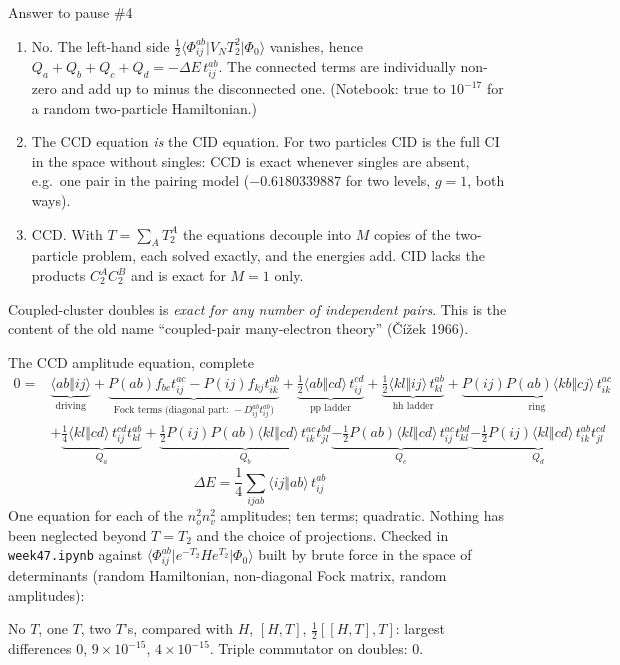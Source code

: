 \documentclass[aspectratio=169,10pt]{beamer}
\newcounter{thinkctr}
\newcommand{\thinka}[1]{%
  \vfill
  \begin{tcolorbox}[enhanced,colback=paleteal,colframe=teal,boxrule=1.2pt,arc=4pt,
    grow to left by=6mm,grow to right by=6mm,
    left=16pt,right=16pt,top=16pt,bottom=18pt,
    fonttitle=\bfseries\Large,fontupper=\large,
    title={Answer to pause \#\thethinkctr}]
  #1
  \end{tcolorbox}
  \vfill}
\newcommand{\numbox}[1]{%
  \begin{tcolorbox}[colback=palegreen,colframe=teal!70!black,title={\bfseries Measured}]
  #1
  \end{tcolorbox}}
\newcommand{\mel}[3]{\langle #1\lvert #2\rvert #3\rangle}
\newcommand{\ph}{\Phi_0}
\newcommand{\as}[4]{\langle #1#2\Vert #3#4\rangle}
\begin{document}
\begin{frame}[shrink=1]{Answer to pause \#4}
\thinka{%
\begin{enumerate}
\item No. The left-hand side $\tfrac12\mel{\Phi_{ij}^{ab}}{V_NT_2^2}{\ph}$ vanishes, hence $Q_a+Q_b+Q_c+Q_d=-\Delta E\,t_{ij}^{ab}$. The connected terms are individually non-zero and add up to minus the disconnected one. (Notebook: true to $10^{-17}$ for a random two-particle Hamiltonian.)
\item The CCD equation \emph{is} the CID equation. For two particles CID is the full CI in the space without singles: CCD is exact whenever singles are absent, e.g.\ one pair in the pairing model ($-0.6180339887$ for two levels, $g=1$, both ways).
\item CCD. With $T=\sum_AT_2^{A}$ the equations decouple into $M$ copies of the two-particle problem, each solved exactly, and the energies add. CID lacks the products $C_2^AC_2^B$ and is exact for $M=1$ only.
\end{enumerate}
Coupled-cluster doubles is \emph{exact for any number of independent pairs}. This is the content of the old name ``coupled-pair many-electron theory'' (\v{C}\'i\v{z}ek 1966).}
\end{frame}

\begin{frame}[shrink=10]{The CCD amplitude equation, complete}
\small
\begin{align*}
0={}&\underbrace{\as abij}_{\text{driving}}
 +\underbrace{P(ab)f_{bc}t_{ij}^{ac}-P(ij)f_{kj}t_{ik}^{ab}}_{\text{Fock terms (diagonal part: }-D_{ij}^{ab}t_{ij}^{ab})}
 +\underbrace{\tfrac12\as abcd\,t_{ij}^{cd}}_{\text{pp ladder}}
 +\underbrace{\tfrac12\as klij\,t_{kl}^{ab}}_{\text{hh ladder}}
 +\underbrace{P(ij)P(ab)\as kbcj\,t_{ik}^{ac}}_{\text{ring}}\\[2pt]
 &+\underbrace{\tfrac14\as klcd\,t_{ij}^{cd}t_{kl}^{ab}}_{Q_a}
 +\underbrace{\tfrac12P(ij)P(ab)\as klcd\,t_{ik}^{ac}t_{jl}^{bd}}_{Q_b}
 \underbrace{-\tfrac12P(ab)\as klcd\,t_{ij}^{ac}t_{kl}^{bd}}_{Q_c}
 \underbrace{-\tfrac12P(ij)\as klcd\,t_{ik}^{ab}t_{jl}^{cd}}_{Q_d}
\end{align*}
\[
 \Delta E=\frac14\sum_{ijab}\as ijab\,t_{ij}^{ab}
\]
One equation for each of the $n_o^2n_v^2$ amplitudes; ten terms; quadratic. Nothing has been neglected beyond $T=T_2$ and the choice of projections. Checked in \texttt{week47.ipynb} against $\mel{\Phi_{ij}^{ab}}{e^{-T_2}He^{T_2}}{\ph}$ built by brute force in the space of determinants (random Hamiltonian, non-diagonal Fock matrix, random amplitudes):
\numbox{No $T$, one $T$, two $T$'s, compared with $H$, $[H,T]$, $\tfrac12[[H,T],T]$: largest differences $0$, $9\times10^{-15}$, $4\times10^{-15}$. Triple commutator on doubles: $0$.}
\end{frame}
\end{document}
